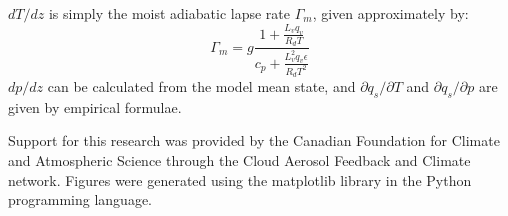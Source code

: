 \documentclass[acp]{copernicus}
\begin{document}
$dT/dz$ is simply the moist adiabatic lapse rate $\Gamma_m$, given 
approximately by:
\begin{equation}
\Gamma_m = g\frac{1 + \frac{L_v q_v}{R_d T}}{c_p + \frac{L_v^2 q_v \epsilon}{R_d T^2}}
\end{equation}
$dp/dz$ can be calculated from the model mean state, and 
$\partial q_s/\partial T$ and $\partial q_s/\partial p$ are given
by empirical formulae.



\begin{acknowledgements}
Support for this research was provided by the Canadian Foundation for Climate 
and Atmospheric Science through the Cloud Aerosol Feedback and Climate 
network.  Figures were generated using the matplotlib library in the Python
programming language.
\end{acknowledgements}















\end{document}
